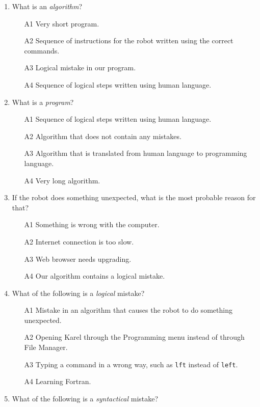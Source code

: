 \begin{enumerate}
\item What is an {\em algorithm}?
\begin{enumerate}
\item[A1] Very short program.
\item[A2] Sequence of instructions for the robot written using the correct commands.
\item[A3] Logical mistake in our program.
\item[A4] Sequence of logical steps written using human language.
\end{enumerate}
\item What is a {\em program}?
\begin{enumerate}
\item[A1] Sequence of logical steps written using human language.
\item[A2] Algorithm that does not contain any mistakes.
\item[A3] Algorithm that is translated from human language to programming language.
\item[A4] Very long algorithm.
\end{enumerate}
\item If the robot does something unexpected, what is the most probable reason for that?
\begin{enumerate}
\item[A1] Something is wrong with the computer.
\item[A2] Internet connection is too slow.
\item[A3] Web browser needs upgrading.
\item[A4] Our algorithm contains a logical mistake.
\end{enumerate}
\item What of the following is a {\em logical} mistake?
\begin{enumerate}
\item[A1] Mistake in an algorithm that causes the robot to do something unexpected.
\item[A2] Opening Karel through the Programming menu instead of through File Manager. 
\item[A3] Typing a command in a wrong way, such as {\tt lft} instead of {\tt left}.
\item[A4] Learning Fortran.
\end{enumerate}
\item What of the following is a {\em syntactical} mistake?
\begin{enumerate}

\end{enumerate}
\end{enumerate}
